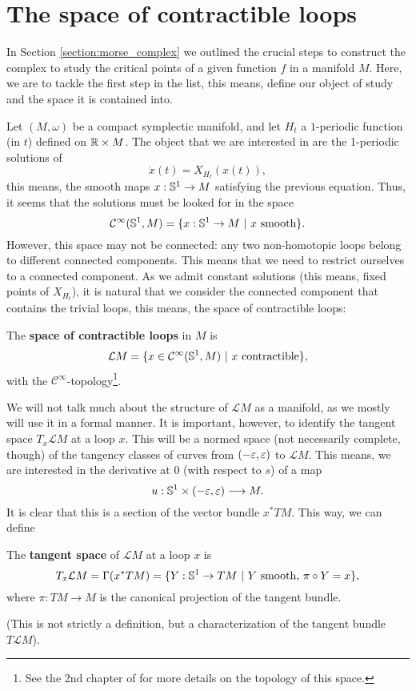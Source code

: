 \section{The space of contractible loops} \label{section:floerq_loops}

In Section \ref{section:morse_complex} we outlined the crucial steps to construct the complex to study the critical points of a given function $f$ in a manifold $M$. Here, we are to tackle the first step in the list, this means, define our object of study and the space it is contained into.

Let $(M,\omega)$ be a compact symplectic manifold, and let $H_t$ a $1$-periodic function (in $t$) defined on $\mathbb{R} \times M$. The object that we are interested in are the 1-periodic solutions of
\[\dot{x}(t) = X_{H_t}(x(t)) ,\]
this means, the smooth maps $x : \mathbb{S}^1 \rightarrow M$ satisfying the previous equation. Thus, it seems that the solutions must be looked for in the space
\[\mathcal{C}^{\infty}(\mathbb{S}^1,M) = \{ x : \mathbb{S}^1 \rightarrow M \ | \ x \text{ smooth} \} .\]
However, this space may not be connected: any two non-homotopic loops belong to different connected components. This means that we need to restrict ourselves to a connected component. As we admit constant solutions (this means, fixed points of $X_{H_t}$), it is natural that we consider the connected component that contains the trivial loops, this means, the space of contractible loops:

\begin{deff}
The {\bf space of contractible loops} in $M$ is
\[\mathcal{L}M = \{ x \in \mathcal{C}^{\infty}(\mathbb{S}^1,M) \ | \ x \text{ contractible} \} ,\]
with the $\mathcal{C}^{\infty}$-topology\footnote{See the 2nd chapter of \cite{hirsch2012differential} for more details on the topology of this space.}.
\end{deff}

We will not talk much about the structure of $\mathcal{L}M$ as a manifold, as we mostly will use it in a formal manner. It is important, however, to identify the tangent space $T_x\mathcal{L}M$ at a loop $x$. This will be a normed space (not necessarily complete, though) of the tangency classes of curves from $(-\varepsilon,\varepsilon)$ to $\mathcal{L}M$. This means, we are interested in the derivative at $0$ (with respect to $s$) of a map
\[u : \mathbb{S}^1 \times (-\varepsilon,\varepsilon) \longrightarrow M .\]
It is clear that this is a section of the vector bundle $x^{\ast}TM$. This way, we can define

\begin{deff}
The {\bf tangent space} of $\mathcal{L}M$ at a loop $x$ is
\[T_x\mathcal{L}M = \Gamma(x^{\ast}TM) = \{ Y : \mathbb{S}^1 \rightarrow TM \ | \ Y \text{ smooth, } \pi \circ Y = x\},\]
where $\pi : TM \rightarrow M$ is the canonical projection of the tangent bundle.
\end{deff}

(This is not strictly a definition, but a characterization of the tangent bundle $T\mathcal{L}M$).
